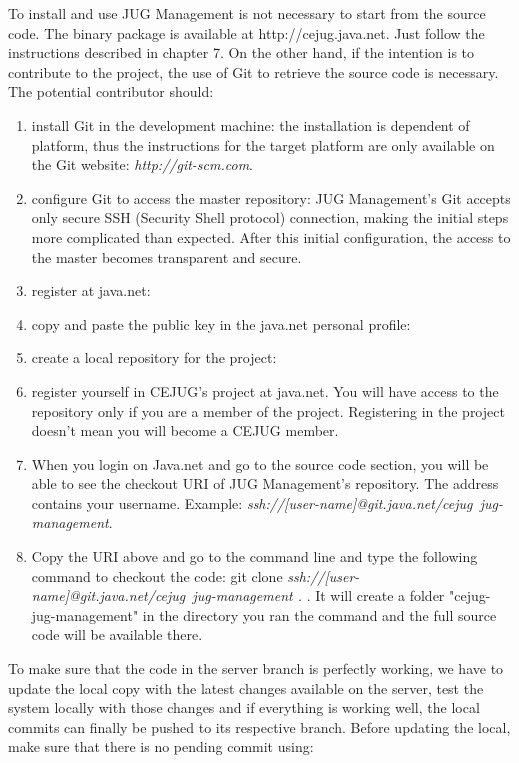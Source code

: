 \documentclass[envcountsame,envcountchap]{svmono}
\begin{document}
To install and use JUG Management is not necessary to start from the source code. The binary package is available at http://cejug.java.net. Just follow the instructions described in chapter 7. On the other hand, if the intention is to contribute to the project, the use of Git to retrieve the source code is necessary. The potential contributor should:

\begin{enumerate}
\item install Git in the development machine: the installation is dependent of platform, thus the instructions for the target platform are only available on the Git website: \textit{http://git-scm.com}.
\item configure Git to access the master repository: JUG Management's Git accepts only secure SSH (Security Shell protocol) connection, making the initial steps more complicated than expected. After this initial configuration, the access to the master becomes transparent and secure.
\item register at java.net:
\item copy and paste the public key in the java.net personal profile:
\item create a local repository for the project: 
\item register yourself in CEJUG's project at java.net. You will have access to the repository only if you are a member of the project. Registering in the project doesn't mean you will become a CEJUG member.
\item When you login on Java.net and go to the source code section, you will be able to see the checkout URI of JUG Management's repository. The address contains your username. Example: \textit{ssh://[user-name]@git.java.net/cejug~jug-management}.
\item Copy the URI above and go to the command line and type the following command to checkout the code: git clone \textit{ssh://[user-name]@git.java.net/cejug~jug-management .} . It will create a folder "cejug-jug-management" in the directory you ran the command and the full source code will be available there.
\end{enumerate}

To make sure that the code in the server branch is perfectly working, we have to update the local copy with the latest changes available on the server, test the system locally with those changes and if everything is working well, the local commits can finally be pushed to its respective branch. Before updating the local, make sure that there is no pending commit using:
\end{document}
